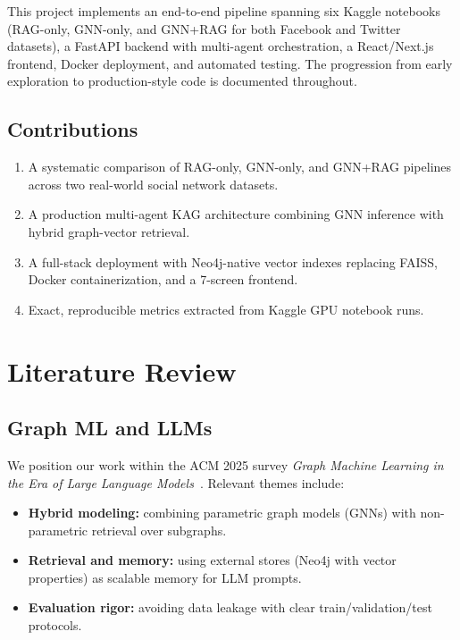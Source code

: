 \documentclass[conference]{IEEEtran}
\begin{document}
This project implements an end-to-end pipeline spanning six Kaggle notebooks (RAG-only, GNN-only, and GNN+RAG for both Facebook and Twitter datasets), a FastAPI backend with multi-agent orchestration, a React/Next.js frontend, Docker deployment, and automated testing. The progression from early exploration to production-style code is documented throughout.

\subsection{Contributions}
\begin{enumerate}
  \item A systematic comparison of RAG-only, GNN-only, and GNN+RAG pipelines across two real-world social network datasets.
  \item A production multi-agent KAG architecture combining GNN inference with hybrid graph-vector retrieval.
  \item A full-stack deployment with Neo4j-native vector indexes replacing FAISS, Docker containerization, and a 7-screen frontend.
  \item Exact, reproducible metrics extracted from Kaggle GPU notebook runs.
\end{enumerate}

\section{Literature Review}

\subsection{Graph ML and LLMs}
We position our work within the ACM 2025 survey \emph{Graph Machine Learning in the Era of Large Language Models}~\cite{acm_survey_gml_llm}. Relevant themes include:
\begin{itemize}
  \item \textbf{Hybrid modeling:} combining parametric graph models (GNNs) with non-parametric retrieval over subgraphs.
  \item \textbf{Retrieval and memory:} using external stores (Neo4j with vector properties) as scalable memory for LLM prompts.
  \item \textbf{Evaluation rigor:} avoiding data leakage with clear train/validation/test protocols.
\end{itemize}
\end{document}

